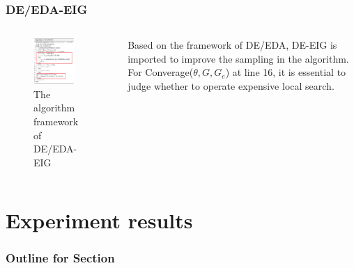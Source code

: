 \documentclass[xcolor=dvipsnames]{beamer}
\begin{document}
    \begin{frame}
    \frametitle{DE/EDA-EIG}
    \begin{columns}
        \begin{column}{0.5\textwidth}
        \begin{figure}[H]
            \graphicspath{{figs/}}
            \includegraphics[width=0.8\textwidth]{deeda-eig.png}
            \caption{The algorithm framework of DE/EDA-EIG}
        \end{figure}
    \end{column}
    \begin{column}{0.5\textwidth}
    Based on the framework of DE/EDA, DE-EIG is imported to improve the sampling in the algorithm. For Converage($\theta, G, G_e$) at line 16, it is essential to judge whether to operate expensive local search.
    \end{column}
    \end{columns}
    \end{frame}



    \section{Experiment results}
    \begin{frame}
      \frametitle{Outline for Section \thesection}
      \tableofcontents[currentsection]
    \end{frame}
\end{document}
